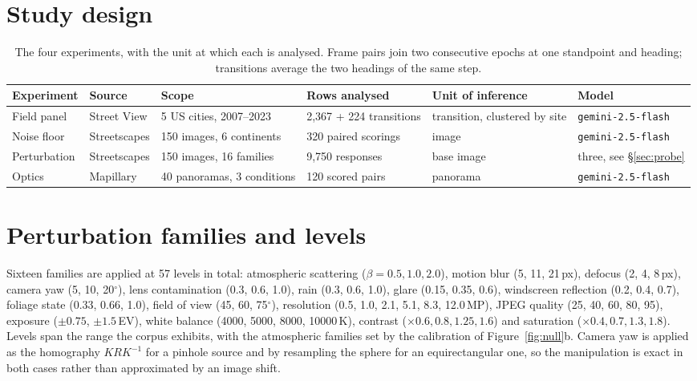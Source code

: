 \appendix

\section{Study design}

\begin{table}[!htbp]
  \caption{The four experiments, with the unit at which each is analysed.
  Frame pairs join two consecutive epochs at one standpoint and heading;
  transitions average the two headings of the same step.}
  \label{tab:design}
  \centering
  \scriptsize
  \begin{tabular}{@{}llllll@{}}
    \toprule
    Experiment & Source & Scope & Rows analysed & Unit of inference & Model \\
    \midrule
    Field panel  & Street View     & 5 US cities, 2007--2023 & 2{,}367 + 224 transitions & transition, clustered by site & \texttt{gemini-2.5-flash} \\
    Noise floor  & Streetscapes    & 150 images, 6 continents & 320 paired scorings & image & \texttt{gemini-2.5-flash} \\
    Perturbation & Streetscapes    & 150 images, 16 families & 9{,}750 responses & base image & three, see \S\ref{sec:probe} \\
    Optics       & Mapillary       & 40 panoramas, 3 conditions & 120 scored pairs & panorama & \texttt{gemini-2.5-flash} \\
    \bottomrule
  \end{tabular}
\end{table}

\section{Perturbation families and levels}

Sixteen families are applied at 57 levels in total: atmospheric scattering
($\beta = 0.5, 1.0, 2.0$), motion blur (5, 11, 21\,px), defocus (2, 4, 8\,px),
camera yaw (5, 10, 20$^\circ$), lens contamination (0.3, 0.6, 1.0), rain (0.3,
0.6, 1.0), glare (0.15, 0.35, 0.6), windscreen reflection (0.2, 0.4, 0.7),
foliage state (0.33, 0.66, 1.0), field of view (45, 60, 75$^\circ$), resolution
(0.5, 1.0, 2.1, 5.1, 8.3, 12.0\,MP), JPEG quality (25, 40, 60, 80, 95),
exposure ($\pm0.75$, $\pm1.5$\,EV), white balance (4000, 5000, 8000, 10000\,K),
contrast ($\times0.6, 0.8, 1.25, 1.6$) and saturation ($\times0.4, 0.7, 1.3,
1.8$). Levels span the range the corpus exhibits, with the atmospheric families
set by the calibration of Figure~\ref{fig:null}b. Camera yaw is applied as the
homography $K R K^{-1}$ for a pinhole source and by resampling the sphere for an
equirectangular one, so the manipulation is exact in both cases rather than
approximated by an image shift.

